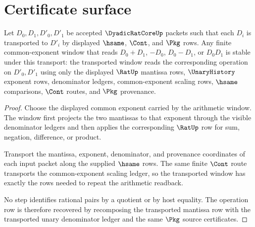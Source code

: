 \section{Certificate surface}
\label{sec:dyadicratcore-certificate}

\begin{theorem}
\label{thm:dyadicratcore-arithmetic-window-stability}
Let $D_0,D_1,D'_0,D'_1$ be accepted $\DyadicRatCoreUp$ packets such that
each $D_i$ is transported to $D'_i$ by displayed $\hsame$, $\Cont$, and
$\Pkg$ rows. Any finite common-exponent window that reads $D_0+D_1$,
$-D_0$, $D_0-D_1$, or $D_0D_1$ is stable under this transport: the
transported window reads the corresponding operation on $D'_0,D'_1$ using
only the displayed $\RatUp$ mantissa rows, $\UnaryHistory$ exponent rows,
denominator ledgers, common-exponent scaling rows, $\hsame$ comparisons,
$\Cont$ routes, and $\Pkg$ provenance.
\end{theorem}
\begin{proof}
Choose the displayed common exponent carried by the arithmetic window. The
window first projects the two mantissas to that exponent through the visible
denominator ledgers and then applies the corresponding $\RatUp$ row for sum,
negation, difference, or product.

Transport the mantissa, exponent, denominator, and provenance coordinates of
each input packet along the supplied $\hsame$ rows. The same finite $\Cont$
route transports the common-exponent scaling ledger, so the transported
window has exactly the rows needed to repeat the arithmetic readback.

No step identifies rational pairs by a quotient or by host equality. The
operation row is therefore recovered by recomposing the transported mantissa
row with the transported unary denominator ledger and the same $\Pkg$ source
certificates.
\end{proof}

